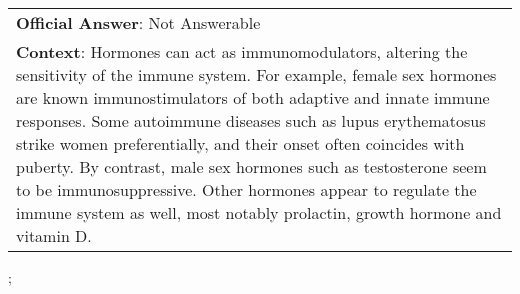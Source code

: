 \begin{figure*}[ht]
{\begin{tabular}{p{}}
            \textbf{Official Answer}: Not Answerable                                                                                                                                                                                                                                                                                                                                                                                                                                                                                                               \\
            \textbf{Context}: Hormones can act as immunomodulators, altering the sensitivity of the immune system. For example, female sex hormones are known immunostimulators of both adaptive and innate immune responses. Some autoimmune diseases such as lupus erythematosus strike women preferentially, and their onset often coincides with puberty. By contrast, male sex hormones such as testosterone seem to be immunosuppressive. Other hormones appear to regulate the immune system as well, most notably prolactin, growth hormone and vitamin D. \\
        \end{tabular}
    };
    \label{fig:ex-5ad4e61e5b96ef001a10a5b0}
\end{figure*}


